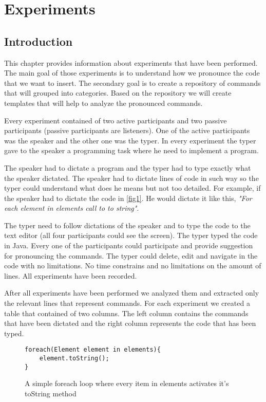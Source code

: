 \chapter{Experiments}
\section{Introduction}
This chapter provides information about experiments that have been performed. The main goal of those experiments is to understand how we pronounce the code that we want to insert. The secondary goal is to create a repository of commands that will grouped into categories. Based on the repository we will create templates that will help to analyze the pronounced commands.

Every experiment contained of two active participants and two passive participants (passive participants are listeners). One of the active participants was the speaker and the other one was the typer. In every experiment the typer gave to the speaker a programming task where he need to implement a program. 

The speaker had to dictate a program and the typer had to type exactly what the speaker dictated. The speaker had to dictate lines of code in such way so the typer could understand what does he means but not too detailed. For example, if the speaker had to dictate the code in \autoref{fig1}. He would dictate it like this, \textit{"For each element in elements call to to string"}. 

The typer need to follow dictations of the speaker and to type the code to the text editor (all four participants could see the screen). The typer typed the code in Java. Every one of the participants could participate and provide suggestion for pronouncing the commands. The typer could delete, edit and navigate in the code with no limitations. No time constrains and no limitations on the amount of lines. All experiments have been recorded.

After all experiments have been performed we analyzed them and extracted only the relevant lines that represent commands. For each experiment we created a table that contained of two columns. The left column contains the commands that have been dictated and the right column represents the code that has been typed.

\begin{figure}[H]
\begin{lstlisting}
foreach(Element element in elements){
	element.toString();
} 
\end{lstlisting}
\caption{A simple foreach loop where every item in elements activates it's toString method}
\label{fig1}
\end{figure}
